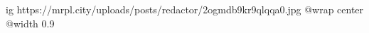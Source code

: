  
 
 
 
 

\ifcmt
  ig https://mrpl.city/uploads/posts/redactor/2ogmdb9kr9qlqqa0.jpg
  @wrap center
  @width 0.9
\fi
